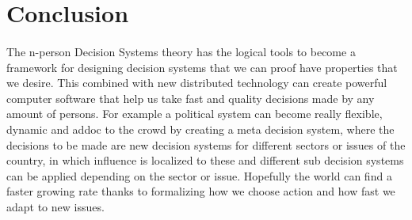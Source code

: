 \section{Conclusion}\label{conclusion}

\paragraph{} The n-person Decision Systems theory has the logical tools to become a framework for designing decision systems that we can proof have properties that we desire. This combined with new distributed technology can create powerful computer software that help us take fast and quality decisions made by any amount of persons. For example a political system can become really flexible, dynamic and addoc to the crowd by creating a meta decision system, where the decisions to be made are new decision systems for different sectors or issues of the country, in which influence is localized to these and different sub decision systems can be applied depending on the sector or issue. Hopefully the world can find a faster growing rate thanks to formalizing how we choose action and how fast we adapt to new issues.